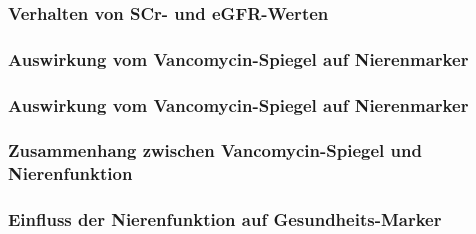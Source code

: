 \documentclass[10pt, aspectratio=169]{beamer}
\begin{document}
\begin{frame}
    \frametitle{Verhalten von SCr- und eGFR-Werten}
\end{frame}

\begin{frame}
    \frametitle{Auswirkung vom Vancomycin-Spiegel auf Nierenmarker}
\end{frame}

\begin{frame}
    \frametitle{Auswirkung vom Vancomycin-Spiegel auf Nierenmarker}
\end{frame}

\begin{frame}
	\frametitle{Zusammenhang zwischen Vancomycin-Spiegel und Nierenfunktion}
\end{frame}

\begin{frame}
	\frametitle{Einfluss der Nierenfunktion auf Gesundheits-Marker}
\end{frame}
\end{document}
